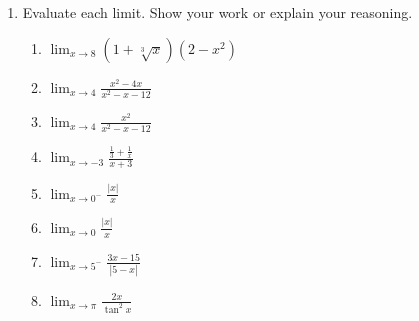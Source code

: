 \documentclass[11pt,fleqn]{article}
\begin{document}
\setlength{\parindent}{0cm}
\renewcommand{\headrulewidth}{0pt}
\newcommand{\blank}[1]{\rule{#1}{0.75pt}}
\renewcommand{\d}{\displaystyle}
\vspace*{-0.9in}
\begin{center}
  \LARGE {}
\end{center}
\small
\begin{enumerate}
\item Evaluate each limit. Show your work or explain your reasoning.
\begin{enumerate}
\item $\displaystyle{\lim_{x \to 8 }(1+\sqrt[3]{x})(2-x^2)}$
\vfill
\item $\displaystyle{\lim_{x \to 4}\frac{x^2-4x}{x^2-x-12}}$
\vfill

\item $\displaystyle{\lim_{x \to 4}\frac{x^2}{x^2-x-12}}$
\vfill

\item $\displaystyle{\lim_{x \to -3 }\frac{\frac{1}{3}+\frac{1}{x}}{x+3}}$
\vfill

\newpage

\item $\displaystyle{\lim_{x \to 0^-}\frac{|x|}{x}}$
\vfill

\item $\displaystyle{\lim_{x \to 0}\frac{|x|}{x}}$
\vfill

\item $\displaystyle{\lim_{x \to 5^-}\frac{3x-15}{|5-x|}}$
\vfill

\item $\displaystyle{\lim_{x \to \pi}\frac{2x}{\tan^2 x}}$
\vfill
\end{enumerate}
\end{enumerate}
 
\end{document}
